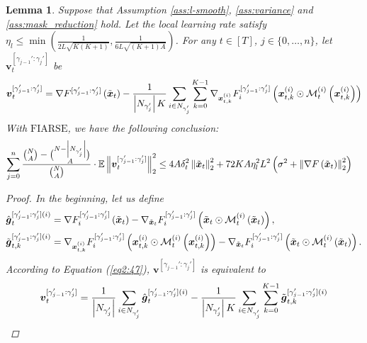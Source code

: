 \documentclass{article}
\theoremstyle{plain}
\newtheorem{lemma}[theorem]{Lemma}
\theoremstyle{definition}
\theoremstyle{remark}
\newcommand{\algo}{\ensuremath{\text{FIARSE}}\xspace}
\newcommand{\E}{\mathbb{E}}
\renewcommand{\eqref}[1]{Equation (\ref{#1})}
\newcommand{\bracket}[1]{\left(#1\right)}
\newcommand{\norm}[1]{\left\|#1\right\|_2^2}
\newcommand{\newmaskgradcons}[3]{\nabla_{\x{#2}} F_{#1}^{[\gamma_{#3-1}':\gamma_{#3}']} \bracket{\x{#2} \odot \mask{#1}{#2} \bracket{\x{#2}}}}
\newcommand{\globaloutergradgammacons}[2]{\nabla F^{[\gamma_{#1-1}': \gamma_{#1}']}\bracket{\x{#2}}}
\begin{document}
\begin{lemma} \label{lemma:3}
Suppose that Assumption \ref{ass:l-smooth}, \ref{ass:variance} and \ref{ass:mask_reduction} hold. Let the local learning rate satisfy $\eta_l \leq \min \bracket{\frac{1}{2L\sqrt{K(K+1)}}, \frac{1}{6L\sqrt{(K+1) A}}}$. For any $t \in [T]$, $j\in\{0, \dots, n\}$, let $\boldsymbol{v}_{t}^{[\gamma_{j-1}':\gamma_{j}']}$ be
\begin{align}
\boldsymbol{v}_{t}^{[\gamma_{j-1}':\gamma_{j}']} = \globaloutergradgammacons{j}{t} - \frac{1}{\left|\n{j}\right| K}  \sum_{i \in \n{j}} \sum_{k=0}^{K-1} \newmaskgrad{i}{t}{k}{j} \label{eq2:47}
\end{align}
With \algo, we have the following conclusion: 
\begin{align}
\sum_{j=0}^n \frac{\binom{N}{A} - \binom{N - \left|\n{j}\right|}{A}}{\binom{N}{A}} \cdot \E\norm{\boldsymbol{v}_{t}^{[\gamma_{j-1}':\gamma_{j}']}} &\leq 4A\delta_t^2 \norm{\x{t}} + 72 K A \eta_l^2 L^2 \bracket{\sigma^2 + \norm{\grad{t}}}\label{eq:27} %
\end{align}
\begin{proof}
In the beginning, let us define 
\begin{align}
\hat{\boldsymbol{g}}^{[\gamma_{j-1}':\gamma_{j}'] (i)}_{t} &= \gggamma{j}{t}{i} - \newmaskgradcons{i}{t}{j},\\
\tilde{\boldsymbol{g}}^{[\gamma_{j-1}':\gamma_{j}'] (i)}_{t, k} &= \newmaskgrad{i}{t}{k}{j} - \newmaskgradcons{i}{t}{j}. \label{eq2:50}
\end{align}
According to \eqref{eq2:47}, $\boldsymbol{v}^{[\gamma_{j-1}':\gamma_{j}']}$ is equivalent to 
\begin{align}
\boldsymbol{v}_{t}^{[\gamma_{j-1}':\gamma_{j}']} = \frac{1}{\left|N_{\gamma_{j}'} \right|} \sum_{i \in N_{\gamma_{j}'}} \hat{\boldsymbol{g}}^{[\gamma_{j-1}':\gamma_{j}'] (i)}_{t} - \frac{1}{\left|N_{\gamma_{j}'} \right| K}  \sum_{i \in N_{\gamma_{j}'}} \sum_{k=0}^{K-1} \tilde{\boldsymbol{g}}^{[\gamma_{j-1}':\gamma_{j}'] (i)}_{t, k}
\end{align}


\end{proof}
\end{lemma}
\end{document}
